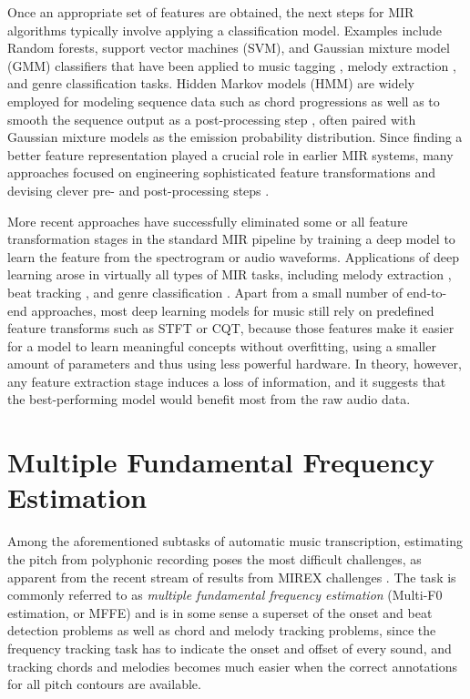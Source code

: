 Once an appropriate set of features are obtained, the next steps for MIR algorithms typically involve applying a classification model.
Examples include Random forests, support vector machines (SVM), and Gaussian mixture model (GMM) classifiers that have been applied to music tagging \cite{ness2009tag}, melody extraction \cite{bittner2015contour}, and genre classification \cite{tzanetakis2002genre} tasks.
Hidden Markov models (HMM) are widely employed for modeling sequence data such as chord progressions \cite{cho2010chord} as well as to smooth the sequence output as a post-processing step \cite{khadkevich2009hmm}, often paired with Gaussian mixture models as the emission probability distribution.
Since finding a better feature representation played a crucial role in earlier MIR systems, many approaches focused on engineering sophisticated feature transformations \cite{harte2006tonnetz} and devising clever pre- and post-processing steps \cite{oudre2009chord}.


More recent approaches have successfully eliminated some or all feature transformation stages in the standard MIR pipeline by training a deep model to learn the feature from the spectrogram or audio waveforms.
Applications of deep learning arose in virtually all types of MIR tasks, including melody extraction \cite{bittner2017deepsalience}, beat tracking \cite{vogl2017drum}, and genre classification \cite{oramas2017genre}.
Apart from a small number of end-to-end approaches, most deep learning models for music still rely on predefined feature transforms such as STFT or CQT, because those features make it easier for a model to learn meaningful concepts without overfitting, using a smaller amount of parameters and thus using less powerful hardware.
In theory, however, any feature extraction stage induces a loss of information, and it suggests that the best-performing model would benefit most from the raw audio data.


\section{Multiple Fundamental Frequency Estimation}

Among the aforementioned subtasks of automatic music transcription, estimating the pitch from polyphonic recording poses the most difficult challenges, as apparent from the recent stream of results from MIREX challenges \cite{downie2014mirex}.
The task is commonly referred to as \emph{multiple fundamental frequency estimation} (Multi-F0 estimation, or MFFE) and is in some sense a superset of the onset and beat detection problems as well as chord and melody tracking problems,
since the frequency tracking task has to indicate the onset and offset of every sound, and tracking chords and melodies becomes much easier when the correct annotations for all pitch contours are available.


